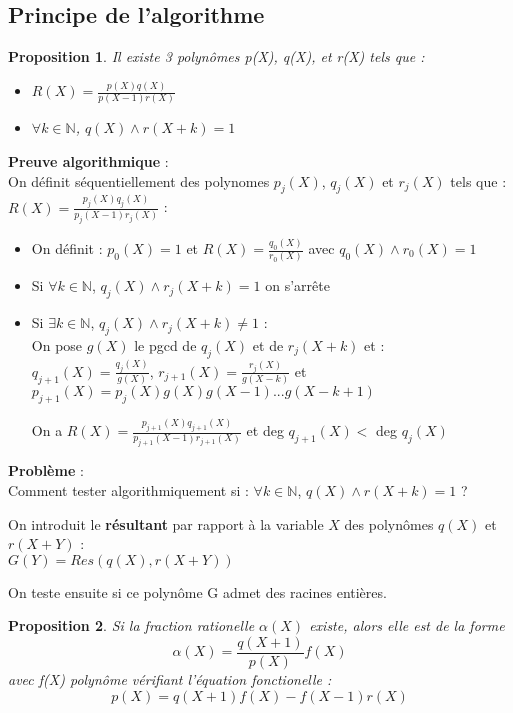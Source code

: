 \documentclass[17 pt,french]{scrartcl}
\newtheorem{prop}{Proposition}
\begin{document}
	\subsection*{Principe de l'algorithme}
	\begin{prop}
		Il existe 3 polynômes p(X), q(X), et r(X) tels que : 
		\begin{itemize}
		 \item $R(X) = \frac{p(X)q(X)}{p(X-1)r(X)}$
	 	 \item $\forall k \in \mathbb{N}$, $q(X) \wedge r(X+k) = 1 $
	 \end{itemize}
	\end{prop}
	\textbf{Preuve algorithmique} : \\
	On définit séquentiellement des polynomes $p_j(X)$, $q_j(X)$ et $r_j(X)$ tels que : $R(X) = \frac{p_j(X)q_j(X)}{p_j(X-1)r_j(X)}$ : 
		\begin{itemize}
		\item On définit : $p_0(X) = 1$ et $R(X) = \frac{q_0(X)}{r_0(X)} $ avec $q_0(X) \wedge r_0(X) = 1$ 
		\item Si $\forall k \in \mathbb{N}$, $q_j(X) \wedge r_j(X+k) = 1 $ on s'arrête
		\item Si $\exists k \in \mathbb{N}$, $q_j(X) \wedge r_j(X+k) \neq 1 $ : \\
		On pose $g(X)$ le pgcd de $q_j(X)$ et de $r_j(X+k)$ et : \\
		$q_{j+1}(X) = \frac{q_j(X)}{g(X)}$, $r_{j+1}(X) = \frac{r_j(X)}{g(X-k)}$ et \\$p_{j+1}(X) = p_j(X)g(X)g(X-1)...g(X-k+1)$
		
		On a $R(X) = \frac{p_{j+1}(X)q_{j+1}(X)}{p_{j+1}(X-1)r_{j+1}(X)}$ et deg $q_{j+1}(X) < $ deg $q_{j}(X)$
		\end{itemize}
		
		
\textbf{Problème} : \\
Comment tester algorithmiquement si :  $\forall k \in \mathbb{N}$, $q(X) \wedge r(X+k) = 1 $ ?
	
On introduit le \textbf{résultant} par rapport à la variable $X$ des polynômes $q(X)$ et $r(X+Y)$ : \\$G(Y) = Res(q(X), r(X+Y))$ 

On teste ensuite si ce polynôme G admet des racines entières.

	\begin{prop}
		Si la fraction rationelle $\alpha(X)$ existe, alors elle est de la forme 
			$$\alpha(X) = \frac{q(X+1)}{p(X)}f(X)$$
	    avec f(X) polynôme vérifiant l'équation fonctionelle : 
	        $$p(X) = q(X+1)f(X)-f(X-1)r(X)$$
	\end{prop}
	
\end{document}

